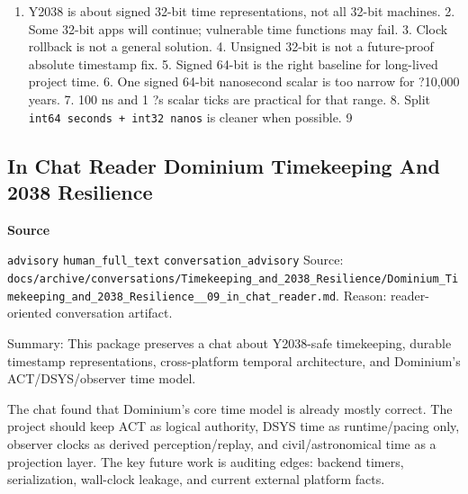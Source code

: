 \documentclass[9pt,a4paper,openany]{book}
\newcommand{\vonecallout}[3]{\par\medskip\noindent\begingroup\setlength{\fboxsep}{7pt}\colorbox{DomCalloutBg}{\parbox{0.94\linewidth}{\textbf{\textcolor{#1}{#2}}\par #3}}\endgroup\par\medskip}
\begin{document}
\begin{enumerate}
\item Y2038 is about signed 32-\allowbreak{}bit time representations, not all 32-\allowbreak{}bit machines.\allowbreak{} 2.\allowbreak{} Some 32-\allowbreak{}bit apps will continue; vulnerable time functions may fail.\allowbreak{} 3.\allowbreak{} Clock rollback is not a general solution.\allowbreak{} 4.\allowbreak{} Unsigned 32-\allowbreak{}bit is not a future-\allowbreak{}proof absolute timestamp fix.\allowbreak{} 5.\allowbreak{} Signed 64-\allowbreak{}bit is the right baseline for long-\allowbreak{}lived project time.\allowbreak{} 6.\allowbreak{} One signed 64-\allowbreak{}bit nanosecond scalar is too narrow for ?10,000 years.\allowbreak{} 7.\allowbreak{} 100 ns and 1 ?s scalar ticks are practical for that range.\allowbreak{} 8.\allowbreak{} Split \texttt{int64 seconds + int32 nanos} is cleaner when possible.\allowbreak{} 9
\end{enumerate}


\subsection{In Chat Reader Dominium Timekeeping And 2038 Resilience}

\vonecallout{DomSlate}{Source}{\texttt{advisory} \texttt{human\_\allowbreak{}full\_\allowbreak{}text} \texttt{conversation\_\allowbreak{}advisory} Source: \texttt{docs/\allowbreak{}archive/\allowbreak{}conversations/\allowbreak{}Timekeeping\_\allowbreak{}and\_\allowbreak{}2038\_\allowbreak{}Resilience/\allowbreak{}Dominium\_\allowbreak{}Timekeeping\_\allowbreak{}and\_\allowbreak{}2038\_\allowbreak{}Resilience\_\allowbreak{}\_\allowbreak{}09\_\allowbreak{}in\_\allowbreak{}chat\_\allowbreak{}reader.\allowbreak{}md}.\allowbreak{} Reason: reader-\allowbreak{}oriented conversation artifact.\allowbreak{}}

Summary: This package preserves a chat about Y2038-\allowbreak{}safe timekeeping, durable timestamp representations, cross-\allowbreak{}platform temporal architecture, and Dominium's ACT/\allowbreak{}DSYS/\allowbreak{}observer time model.\allowbreak{}


The chat found that Dominium's core time model is already mostly correct.\allowbreak{} The project should keep ACT as logical authority, DSYS time as runtime/\allowbreak{}pacing only, observer clocks as derived perception/\allowbreak{}replay, and civil/\allowbreak{}astronomical time as a projection layer.\allowbreak{} The key future work is auditing edges: backend timers, serialization, wall-\allowbreak{}clock leakage, and current external platform facts.\allowbreak{}
\end{document}
